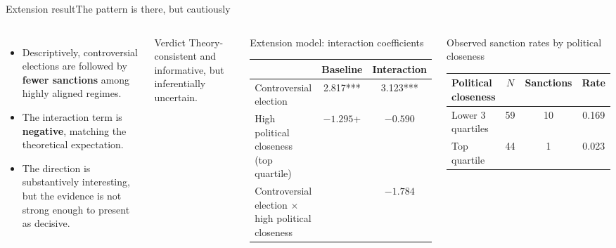 \documentclass[
11pt,notheorems,hyperref={pdfauthor=Jakob}
]{beamer}
\begin{document}
	\begin{frame}{Extension result}{The pattern is there, but cautiously}
		\begin{columns}[T,onlytextwidth]
			\begin{itemize}
				\item Descriptively, controversial elections are followed by \textbf{fewer sanctions} among highly aligned regimes.
				\item The interaction term is \textbf{negative}, matching the theoretical expectation.
				\item The direction is substantively interesting, but the evidence is not strong enough to present as decisive.
			\end{itemize}
			
			\vspace{0.4em}
			\begin{block}{Verdict}
				Theory-consistent and informative, but inferentially uncertain.
			\end{block}
			
			\begin{block}{\centering \footnotesize Extension model: interaction coefficients}
				\centering
				\scriptsize
				\begin{tabular}{lcc}
					\hline
					& Baseline & Interaction \\
					\hline
					Controversial election & 2.817*** & 3.123*** \\
					High political closeness (top quartile) & $-1.295$+ & $-0.590$ \\
					Controversial election $\times$ high political closeness &  & $-1.784$ \\
					\hline
				\end{tabular}
			\end{block}
			
			\vspace{0.3em}
			
			\begin{block}{\centering \footnotesize Observed sanction rates by political closeness}
				\centering
				\scriptsize
				\begin{tabular}{lccc}
					\hline
					Political closeness & $N$ & Sanctions & Rate \\
					\hline
					Lower 3 quartiles & 59 & 10 & 0.169 \\
					Top quartile & 44 & 1 & 0.023 \\
					\hline
				\end{tabular}
			\end{block}
		\end{columns}
	\end{frame}
		
\end{document}
